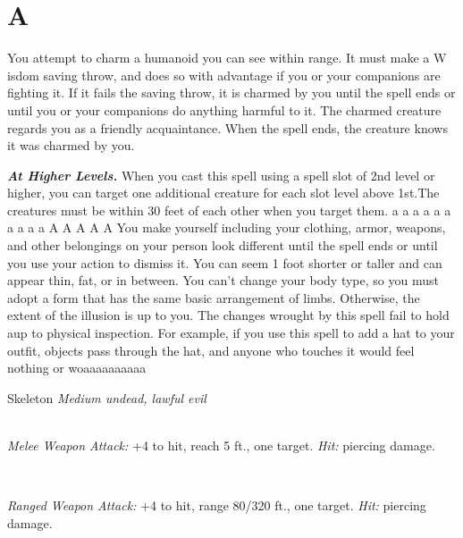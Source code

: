 \documentclass[10pt,twoside,twocolumn,openany]{book}
\newcommand\impact[1]{
	\textbf{\textit{#1}}
}
\begin{document}
\chapter{A}
You attempt to charm a humanoid you can see within range. It must make a W isdom saving throw, and does so with advantage if you or your companions are fighting it. If it fails the saving throw, it is charmed by you until the spell ends or until you or your companions do anything harmful to it. The charmed creature regards you as a friendly acquaintance. When the spell ends, the creature knows it was charmed by you.
\impact{At Higher Levels.} When you cast this spell using a spell slot of 2nd level or higher, you can target one additional creature for each slot level above 1st.The creatures must be within 30 feet of each other when you target them.
{a}
{a}
{a}
{a}
{a}
{a}
{a}
{a}
{a}
{a}
{A}
{A}
{A}
{A}
{A}
You make yourself including your clothing, armor, weapons, and other belongings on your person look different until the spell ends or until you use your action to dismiss it. You can seem 1 foot shorter or taller and can appear thin, fat, or in between. You can't change your body type, so you must adopt a form that has the same basic arrangement of limbs. Otherwise, the extent of the illusion is up to you.
The changes wrought by this spell fail to hold aup to physical inspection. For example, if you use this spell to add a hat to your outfit, objects pass through the hat, and anyone who touches it would feel nothing or woaaaaaaaaaa
\newpage
\begin{monsterbox}{Skeleton}
	\textit{Medium undead, lawful evil}\\
	\hline
	\basics[
	]
	\hline
	\stats[
	]
	\hline
	\details[
		damagevulnerabilities = bludgeoning,
		damageimmunities = poison,
		conditionimmunities = {exhaustion, poisoned},
		senses		= {darkvision 60 ft., passive Perception 9},
		languages		= {understands all languages it knew in life but can't speak},
	]
	\hline \\[1mm]
	\begin{monsteraction}[Shortsword]
		\textit{Melee Weapon Attack:} +4 to hit, reach 5 ft., one target. \textit{Hit:}  piercing damage.
	\end{monsteraction}\\
	\begin{monsteraction}[Shortbow]
		\textit{Ranged Weapon Attack:} +4 to hit, range 80/320 ft., one target. \textit{Hit:}  piercing damage.
	\end{monsteraction}
\end{monsterbox}
\end{document}
